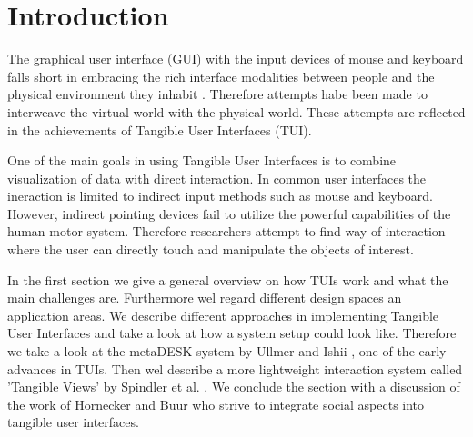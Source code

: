 \section{Introduction}


\copyrightspace


The graphical user interface (GUI) with the input devices of mouse and keyboard falls short in embracing the rich interface modalities between people and the physical environment they inhabit \cite{ullmer97}. Therefore attempts habe been made to interweave the virtual world with the physical world. These attempts are reflected in the achievements of Tangible User Interfaces (TUI). 

One of the main goals in using Tangible User Interfaces is to combine visualization of data with direct interaction. 
In common user interfaces the ineraction is limited to indirect input methods such as mouse and keyboard. However, indirect pointing devices fail to utilize the powerful capabilities of the human motor system. Therefore researchers attempt to find way of interaction where the user can directly touch and manipulate the objects of interest.


In the first section we give a general overview on how TUIs work and what the main challenges are.
Furthermore wel regard different design spaces an application areas. 
We describe different approaches in implementing Tangible User Interfaces and take a look at how a system setup could look like. 
Therefore we take a look at the metaDESK system by Ullmer and Ishii \cite{ullmer97}, one of the early advances in TUIs. 
Then wel describe a more lightweight interaction system called 'Tangible Views' by Spindler et al. \cite{spindler10}.
We conclude the section with a discussion of the work of Hornecker and Buur \cite{hornecker06} who strive to integrate social aspects into tangible user interfaces. 

